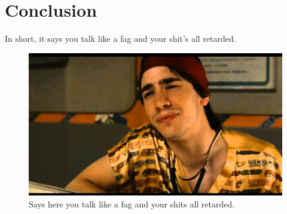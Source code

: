 \chapter{Conclusion}
In short, it says you talk like a fag and your shit's all retarded.
\begin{figure}[h!]
  \centering
  \includegraphics[width=1\textwidth]{fig/conclusion.jpg}
  \caption{Says here you talk like a fag and your shits all retarded.}
  \label{cyborgOverviewSimple}
\end{figure}

